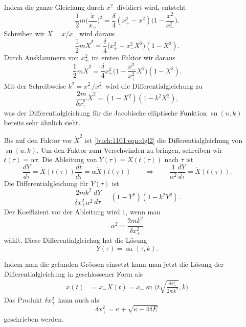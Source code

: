 \begin{loesung}
\begin{teilaufgaben}
\item
Indem die ganze Gleichung durch $x_-^2$ dividiert wird, entsteht 
\[
\frac12m
\biggl(\frac{\dot{x}}{x_-}\biggr)^2
=
\frac{\delta}{4}
(x_+^2-x^2)
\biggl(1-\frac{x^2}{x_-^2}\biggr).
\]
Schreiben wir $X=x/x_-$ wird daraus
\[
\frac1{2}m\dot{X}^2
=
\frac{\delta}{4}
\biggl(x_+^2-x_-^2 X^2\biggr)
(1-X^2).
\]
Durch Ausklammern von $x_+^2$ im ersten Faktor  wir daraus
\[
\frac1{2}m\dot{X}^2
=
\frac{\delta}{4}
x_+^2
\biggl(1-\frac{x_-^2}{x_+^2} X^2\biggr)
(1-X^2).
\]
Mit der Schreibweise $k^2 = x_-^2/x_+^2$ wird die Differentialgleichung
zu
\begin{equation}
\frac{2m}{\delta x_+^2} \dot{X}^2
=
(1-X^2)(1-k^2X^2),
\label{buch:1101:eqn:dgl2}
\end{equation}
was der Differentialgleichung für die Jacobische elliptische Funktion
$\operatorname{sn}(u,k)$ bereits sehr ähnlich sieht.
\item
Bis auf den Faktor vor $\dot{X}^2$ ist 
\eqref{buch:1101:eqn:dgl2}
die Differentialgleichung
von
$\operatorname{sn}(u,k)$.
Um den Faktor zum Verschwinden zu bringen, schreiben wir 
$t(\tau) = \alpha\tau$.
Die Ableitung von $Y(\tau)=X(t(\tau))$ nach $\tau$ ist
\[
\frac{dY}{d\tau}
=
\dot{X}(t(\tau))\frac{dt}{d\tau}
=
\alpha
\dot{X}(t(\tau))
\qquad\Rightarrow\qquad
\frac{1}{\alpha^2}\frac{dY}{d\tau}
=
\dot{X}(t(\tau)).
\]
Die Differentialgleichung für $Y(\tau)$ ist
\[
\frac{2mk^2}{\delta x_+^2\alpha^2}
\frac{dY}{d\tau}
=
(1-Y^2)(1-k^2Y^2).
\]
Der Koeffizient vor der Ableitung wird $1$, wenn man 
\[
\alpha^2
=
\frac{2mk^2}{\delta x_+^2}
\]
wählt.
Diese Differentialgleichug hat die Lösung
\[
Y(\tau) = \operatorname{sn}(\tau,k).
\]
\item
Indem man die gefunden Grössen einsetzt kann man jetzt die Lösung 
der Differentialgleichung in geschlossener Form als
\begin{align*}
x(t)
&=
x_- X(t)
=
x_- \operatorname{sn}\biggl(
t\sqrt{\frac{\delta x_+^2}{2mk^2} }
,k
\biggr)
\end{align*}
Das Produkt $\delta x_+^2$ kann auch als
\[
\delta x_+^2
=
\kappa+\sqrt{\kappa -4\delta E}
\]
geschrieben werden.
\qedhere
\end{teilaufgaben}
\end{loesung}


